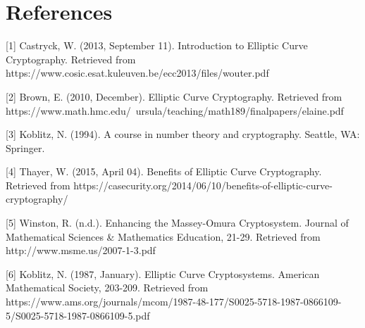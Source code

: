 \chapter{References}
 
 [1] Castryck, W. (2013, September 11). Introduction to Elliptic Curve Cryptography. Retrieved from https://www.cosic.esat.kuleuven.be/ecc2013/files/wouter.pdf
 
 [2] Brown, E. (2010, December). Elliptic Curve Cryptography. Retrieved from https://www.math.hmc.edu/~ursula/teaching/math189/finalpapers/elaine.pdf
 
 [3] Koblitz, N. (1994). A course in number theory and cryptography. Seattle, WA: Springer.
 
 [4] Thayer, W. (2015, April 04). Benefits of Elliptic Curve Cryptography. Retrieved from https://casecurity.org/2014/06/10/benefits-of-elliptic-curve-cryptography/
 
 [5] Winston, R. (n.d.). Enhancing the Massey-Omura Cryptosystem. Journal of Mathematical Sciences & Mathematics Education, 21-29. Retrieved from http://www.msme.us/2007-1-3.pdf
 
[6] Koblitz, N. (1987, January). Elliptic Curve Cryptosystems. American Mathematical Society, 203-209. Retrieved from https://www.ams.org/journals/mcom/1987-48-177/S0025-5718-1987-0866109-5/S0025-5718-1987-0866109-5.pdf